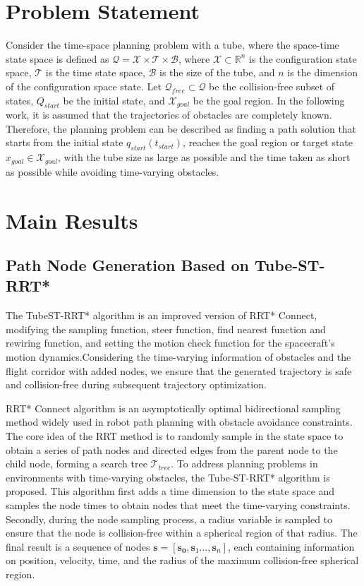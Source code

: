 \documentclass[conference]{IEEEtran}
\begin{document}
    \section{Problem Statement}
    \label{sec2}
    Consider the time-space planning problem with a tube, where the space-time state space is defined as \(\mathcal{Q} = \mathcal{X} \times \mathcal{T} \times \mathcal{B}\), where \(\mathcal{X} \subset \mathbb{R}^n\) is the configuration state space, \(\mathcal{T}\) is the time state space, \(\mathcal{B}\) is the size of the tube, and \(n\) is the dimension of the configuration space state. Let \(\mathcal{Q}_{free} \subset \mathcal{Q}\) be the collision-free subset of states, \(Q_{start}\) be the initial state, and \(\mathcal{X}_{goal}\) be the goal region. In the following work, it is assumed that the trajectories of obstacles are completely known. Therefore, the planning problem can be described as finding a path solution that starts from the initial state \(q_{start}(t_{start})\), reaches the goal region or target state \(x_{goal} \in \mathcal{X}_{goal}\), with the tube size as large as possible and the time taken as short as possible while avoiding time-varying obstacles.
    \section{Main Results}
    \label{sec3}
    \subsection{Path Node Generation Based on Tube-ST-RRT*}
    The TubeST-RRT* algorithm is an improved version of RRT* Connect, modifying the sampling function, steer function, find nearest function and rewiring function, and setting the motion check function for the spacecraft's motion dynamics.Considering the time-varying information of obstacles and the flight corridor with added nodes, we ensure that the generated trajectory is safe and collision-free during subsequent trajectory optimization. 

    RRT* Connect algorithm is an asymptotically optimal bidirectional sampling method widely used in robot path planning with obstacle avoidance constraints. The core idea of the RRT method is to randomly sample in the state space to obtain a series of path nodes and directed edges from the parent node to the child node, forming a search tree $\mathcal{T}_{tree }$. To address planning problems in environments with time-varying obstacles, the Tube-ST-RRT* algorithm is proposed. This algorithm first adds a time dimension to the state space and samples the node times to obtain nodes that meet the time-varying constraints. Secondly, during the node sampling process, a radius variable is sampled to ensure that the node is collision-free within a spherical region of that radius. The final result is a sequence of nodes $\boldsymbol{s} = [\boldsymbol{s_{0}},\boldsymbol{s}_{1}\dots{},\boldsymbol{s}_{n}]$, each containing information on position, velocity, time, and the radius of the maximum collision-free spherical region.
    
\end{document}
